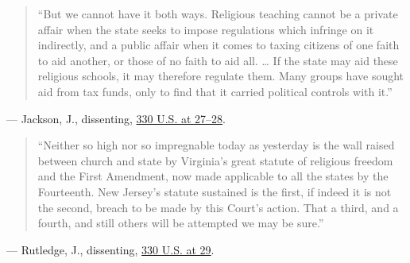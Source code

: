 \documentclass[12pt]{article}
\begin{document}
\begin{quote}
``But we cannot have it both ways. Religious teaching cannot be a private affair when the state seeks to impose regulations which infringe on it indirectly, and a public affair when it comes to taxing citizens of one faith to aid another, or those of no faith to aid all. \ldots{} If the state may aid these religious schools, it may therefore regulate them. Many groups have sought aid from tax funds, only to find that it carried political controls with it.''
\end{quote}
\noindent --- Jackson, J., dissenting, \href{https://www.law.cornell.edu/supremecourt/text/330/1}{330 U.S. at 27--28}.

\begin{quote}
``Neither so high nor so impregnable today as yesterday is the wall raised between church and state by Virginia's great statute of religious freedom and the First Amendment, now made applicable to all the states by the Fourteenth. New Jersey's statute sustained is the first, if indeed it is not the second, breach to be made by this Court's action. That a third, and a fourth, and still others will be attempted we may be sure.''
\end{quote}
\noindent --- Rutledge, J., dissenting, \href{https://supreme.justia.com/cases/federal/us/330/1/}{330 U.S. at 29}.
\end{document}
